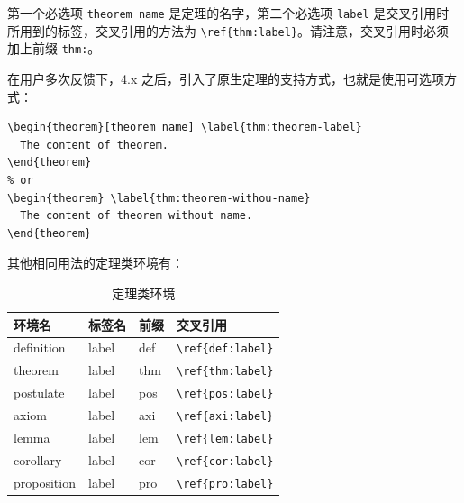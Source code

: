 \documentclass[lang=cn,10pt,cite=super]{elegantbook}
\begin{document}
第一个必选项 \lstinline{theorem name} 是定理的名字，第二个必选项 \lstinline{label} 是交叉引用时所用到的标签，交叉引用的方法为 \verb|\ref{thm:label}|。请注意，交叉引用时必须加上前缀 \lstinline{thm:}。

在用户多次反馈下，4.x 之后，引入了原生定理的支持方式，也就是使用可选项方式：

\begin{lstlisting}
\begin{theorem}[theorem name] \label{thm:theorem-label}
  The content of theorem.
\end{theorem}
% or 
\begin{theorem} \label{thm:theorem-withou-name}
  The content of theorem without name.
\end{theorem}
\end{lstlisting}

其他相同用法的定理类环境有：

\begin{table}[htbp]
   \centering
   \caption{定理类环境}
     \begin{tabular}{llll}
     \toprule
     环境名 & 标签名 & 前缀 & 交叉引用 \\
     \midrule
     definition & label & def   & \lstinline|\ref{def:label}| \\
     theorem & label & thm   & \lstinline|\ref{thm:label}| \\
     postulate & label & pos & \lstinline|\ref{pos:label}| \\
     axiom & label & axi & \lstinline|\ref{axi:label}|\\
     lemma & label & lem   & \lstinline|\ref{lem:label}| \\
     corollary & label & cor   & \lstinline|\ref{cor:label}| \\
     proposition & label & pro   & \lstinline|\ref{pro:label}| \\
     \bottomrule
     \end{tabular}%
   \label{tab:theorem-class}%
 \end{table}%
 
\end{document}
